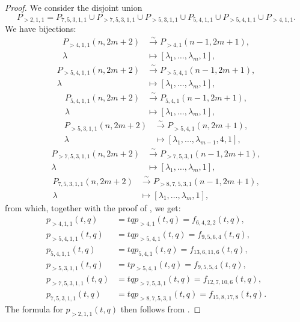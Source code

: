 \documentclass[a4paper, 12pt, reqno]{amsart}
\theoremstyle{remark}
\begin{document}
\begin{proof}
  We consider the disjoint union
  \begin{equation*}
    P_{>2, 1, 1} = P_{7, 5, 3, 1, 1} \cup P_{>7, 5, 3, 1, 1} \cup P_{>5, 3, 1, 1} \cup P_{5, 4, 1, 1} \cup P_{>5, 4, 1, 1} \cup P_{>4, 1, 1}.
  \end{equation*}
  We have bijections:
  \begin{align*}
    P_{>4, 1, 1}(n, 2m + 2) &\xrightarrow{\sim} P_{>4, 1}(n - 1, 2m + 1), \\
    \lambda &\mapsto [\lambda_1, \dots, \lambda_m, 1],
  \end{align*}
  \begin{align*}
    P_{>5, 4, 1, 1}(n, 2m + 2) &\xrightarrow{\sim} P_{>5, 4, 1}(n - 1, 2m + 1), \\
    \lambda &\mapsto [\lambda_1, \dots, \lambda_m, 1],
  \end{align*}
  \begin{align*}
    P_{5, 4, 1, 1}(n, 2m + 2) &\xrightarrow{\sim} P_{5, 4, 1}(n - 1, 2m + 1), \\
    \lambda &\mapsto [\lambda_1, \dots, \lambda_m, 1],
  \end{align*}
  \begin{align*}
    P_{>5, 3, 1, 1}(n, 2m + 2) &\xrightarrow{\sim} P_{>5, 4, 1}(n, 2m + 1), \\
    \lambda &\mapsto [\lambda_1, \dots, \lambda_{m - 1}, 4, 1],
  \end{align*}
  \begin{align*}
    P_{>7, 5, 3, 1, 1}(n, 2m + 2) &\xrightarrow{\sim} P_{>7, 5, 3, 1}(n - 1, 2m + 1), \\
    \lambda &\mapsto [\lambda_1, \dots, \lambda_m, 1],
  \end{align*}
  \begin{align*}
    P_{7, 5, 3, 1, 1}(n, 2m + 2) &\xrightarrow{\sim} P_{>8, 7, 5, 3, 1}(n - 1, 2m + 1), \\
    \lambda &\mapsto [\lambda_1, \dots, \lambda_m, 1],
  \end{align*}
  from which, together with the proof of , we get:
  \begin{align*}
    p_{>4, 1, 1}(t, q) &= tqp_{>4, 1}(t, q) = f_{6, 4, 2, 2}(t, q), \\
    p_{>5, 4, 1, 1}(t, q) &= tqp_{>5, 4, 1}(t, q) = f_{9, 5, 6, 4}(t, q), \\
    p_{5, 4, 1, 1}(t, q) &= tqp_{5, 4, 1}(t, q) = f_{13, 6, 11, 6}(t, q), \\
    p_{>5, 3, 1, 1}(t, q) &= tp_{>5, 4, 1}(t, q) = f_{9, 5, 5, 4}(t, q), \\
    p_{>7, 5, 3, 1, 1}(t, q) &= tqp_{>7, 5, 3, 1}(t, q) = f_{12, 7, 10, 6}(t, q), \\
    p_{7, 5, 3, 1, 1}(t, q) &= tqp_{>8, 7, 5, 3, 1}(t, q) = f_{15, 8, 17, 8}(t, q).
  \end{align*}
  The formula for $p_{>2, 1, 1}(t, q)$ then follows from .
\end{proof}
\end{document}
